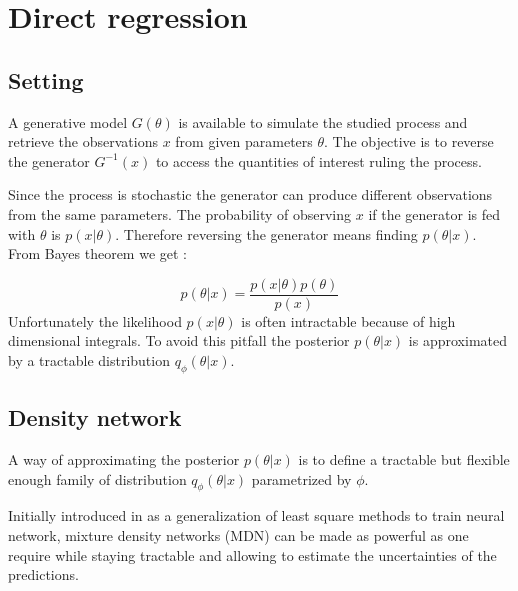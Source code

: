 \section{Direct regression}


\subsection{Setting}

A generative model $G(\theta)$ is available to simulate the studied process and retrieve the observations $x$ from given parameters $\theta$.
The objective is to reverse the generator $G^{-1}(x)$ to access the quantities of interest ruling the process.

Since the process is stochastic the generator can produce different observations from the same parameters.
The probability of observing $x$ if the generator is fed with $\theta$ is $p(x | \theta)$.
Therefore reversing the generator means finding $p(\theta | x)$.
From Bayes theorem we get :

\begin{equation}
    p(\theta | x) = \frac{p(x | \theta) p(\theta) }{p(x)}
\end{equation}
Unfortunately the likelihood $p(x | \theta)$ is often intractable because of high dimensional integrals.
To avoid this pitfall the posterior $p(\theta | x)$ is approximated by a tractable distribution $q_\phi(\theta | x)$.


\subsection{Density network}


A way of approximating the posterior $p(\theta | x)$ is to define a tractable but flexible enough family of distribution $q_\phi(\theta | x)$ parametrized by $\phi$.

Initially introduced in \cite{Bishop94mixturedensity} as a generalization of least square methods to train neural network, mixture density networks (MDN) can be made as powerful as one require while staying tractable and allowing to estimate the uncertainties of the predictions.


